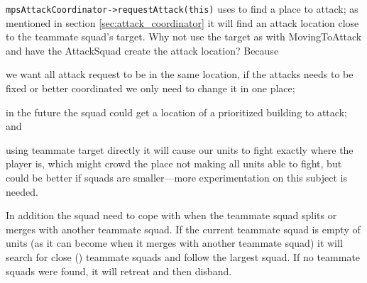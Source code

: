 \texttt{mpsAttackCoordinator->requestAttack(this)} uses  to find a place to attack; as mentioned in section \ref{sec:attack_coordinator} it will find an attack location close to the teammate squad's target. Why not use the target as with MovingToAttack and have the AttackSquad create the attack location? Because
\begin{inparaenum}[1\upshape)]
	\item we want all attack request to be in the same location, if the attacks needs to be fixed or better coordinated we only need to change it in one place;
	\item in the future the squad could get a location of a prioritized building to attack; and
	\item using teammate target directly it will cause our units to fight exactly where the player is, which might crowd the place not making all units able to fight, but could be better if squads are smaller—more experimentation on this subject is needed.
\end{inparaenum}

In addition the squad need to cope with when the teammate squad splits or merges with another teammate squad. If the current teammate squad is empty of units (as it can become when it merges with another teammate squad) it will search for close (\squadAttackFindAlliedSquadDistance) teammate squads and follow the largest squad. If no teammate squads were found, it will retreat and then disband.

